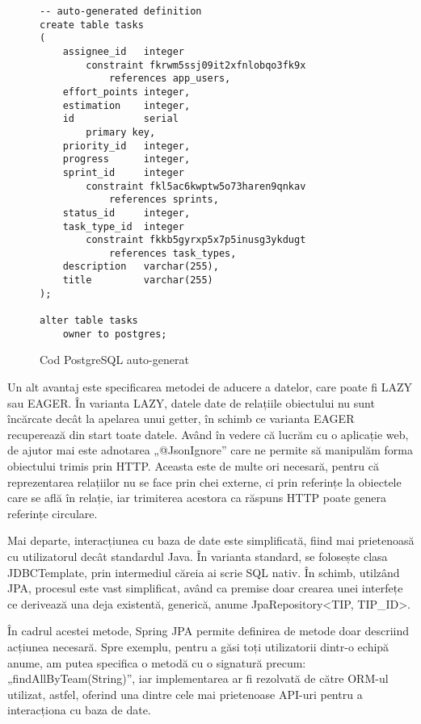 \begin{figure}[H]
	\begin{lstlisting}[frame=single, style=yaml]
-- auto-generated definition
create table tasks
(
    assignee_id   integer
        constraint fkrwm5ssj09it2xfnlobqo3fk9x
            references app_users,
    effort_points integer,
    estimation    integer,
    id            serial
        primary key,
    priority_id   integer,
    progress      integer,
    sprint_id     integer
        constraint fkl5ac6kwptw5o73haren9qnkav
            references sprints,
    status_id     integer,
    task_type_id  integer
        constraint fkkb5gyrxp5x7p5inusg3ykdugt
            references task_types,
    description   varchar(255),
    title         varchar(255)
);

alter table tasks
    owner to postgres;
	\end{lstlisting}
	\label{http-status}
	\caption{ Cod PostgreSQL auto-generat }
\end{figure}

Un alt avantaj este specificarea metodei de aducere a datelor, care poate fi LAZY sau EAGER. În varianta LAZY, datele date de relațiile obiectului nu sunt încărcate decât la apelarea unui getter, în schimb ce varianta EAGER recuperează din start toate datele. Având în vedere că lucrăm cu o aplicație web, de ajutor mai este adnotarea „@JsonIgnore” care ne permite să manipulăm forma obiectului trimis prin HTTP. Aceasta este de multe ori necesară, pentru că reprezentarea relațiilor nu se face prin chei externe, ci prin referințe la obiectele care se află în relație, iar trimiterea acestora ca răspuns HTTP poate genera referințe circulare.

Mai departe, interacțiunea cu baza de date este simplificată, fiind mai prietenoasă cu utilizatorul decât standardul Java. În varianta standard, se folosește clasa JDBCTemplate, prin intermediul căreia ai scrie SQL nativ. În schimb, utilzând JPA, procesul este vast simplificat, având ca premise doar crearea unei interfețe ce derivează una deja existentă, generică, anume JpaRepository<TIP, TIP_ID>. 

În cadrul acestei metode, Spring JPA permite definirea de metode doar descriind acțiunea necesară. Spre exemplu, pentru a găsi toți utilizatorii dintr-o echipă anume, am putea specifica o metodă cu o signatură precum: „findAllByTeam(String)”, iar implementarea ar fi rezolvată de către ORM-ul utilizat, astfel, oferind una dintre cele mai prietenoase API-uri pentru a interacționa cu baza de date.

